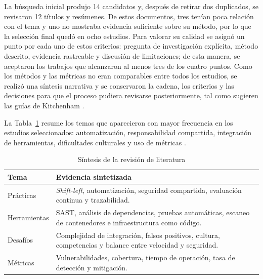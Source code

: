 \documentclass[conference]{IEEEtran}
\begin{document}
La búsqueda inicial produjo 14 candidatos y, después de retirar dos duplicados, se revisaron 12 títulos y resúmenes. De estos documentos, tres tenían poca relación con el tema y uno no mostraba evidencia suficiente sobre su método, por lo que la selección final quedó en ocho estudios. Para valorar su calidad se asignó un punto por cada uno de estos criterios: pregunta de investigación explícita, método descrito, evidencia rastreable y discusión de limitaciones; de esta manera, se aceptaron los trabajos que alcanzaron al menos tres de los cuatro puntos. Como los métodos y las métricas no eran comparables entre todos los estudios, se realizó una síntesis narrativa y se conservaron la cadena, los criterios y las decisiones para que el proceso pudiera revisarse posteriormente, tal como sugieren las guías de Kitchenham \cite{kitchenham2007,kitchenham2009}.

La Tabla~\ref{tab:slr} resume los temas que aparecieron con mayor frecuencia en los estudios seleccionados: automatización, responsabilidad compartida, integración de herramientas, dificultades culturales y uso de métricas \cite{myrbakken2017,rajapakse2022,sanchez2020,zhou2023,akbar2024}.

\begin{table}[ht]
\caption{Síntesis de la revisión de literatura}
\label{tab:slr}
\centering
\begin{tabular}{p{1.7cm}p{4.9cm}}
\toprule
\textbf{Tema} & \textbf{Evidencia sintetizada}\\
\midrule
Prácticas & \textit{Shift-left}, automatización, seguridad compartida, evaluación continua y trazabilidad.\\
Herramientas & SAST, análisis de dependencias, pruebas automáticas, escaneo de contenedores e infraestructura como código.\\
Desafíos & Complejidad de integración, falsos positivos, cultura, competencias y balance entre velocidad y seguridad.\\
Métricas & Vulnerabilidades, cobertura, tiempo de operación, tasa de detección y mitigación.\\
\bottomrule
\end{tabular}
\end{table}
\end{document}
